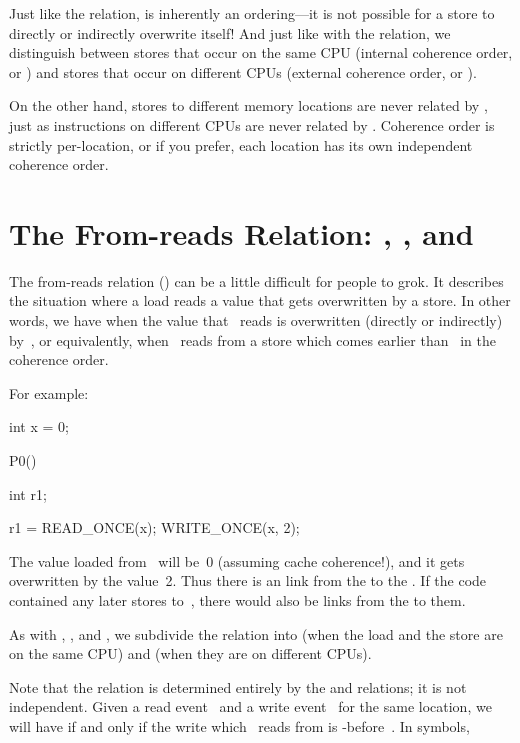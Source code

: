 Just like the  relation,  is inherently an
ordering---it is not possible for a store to directly or indirectly
overwrite itself!
And just like with the  relation, we distinguish between stores that
occur on the same CPU (internal coherence order, or ) and stores
that occur on different CPUs (external coherence order, or ).

On the other hand, stores to different memory locations are never
related by , just as instructions on different CPUs are never
related by .
Coherence order is strictly per-location, or if you prefer, each
location has its own independent coherence order.


\section{The From-reads Relation: , , and }
\label{sec:docs:explanation:The From-reads Relation: fr, fri, and fre}

The from-reads relation () can be a little difficult for people to
grok.
It describes the situation where a load reads a value that gets
overwritten by a store.
In other words, we have  when the value that ~reads
is overwritten (directly or indirectly) by~, or equivalently,
when ~reads from a store which comes earlier than~ in
the coherence order.

For example:

\begin{VerbatimU}
	int x = 0;

	P0()
	{
		int r1;

		r1 = READ_ONCE(x);
		WRITE_ONCE(x, 2);
	}
\end{VerbatimU}

The value loaded from~ will be~0 (assuming cache coherence{!}), and it
gets overwritten by the value~2.
Thus there is an  link from the  to the
.
If the code contained any later stores to~, there would also be
 links from the  to them.

As with , , and , we subdivide the  relation
into  (when the load and the store are on the same CPU) and
 (when they are on different CPUs).

Note that the  relation is determined entirely by the  and
 relations; it is not independent.
Given a read event~ and a write event~ for the same
location, we will have  if and only if the write
which ~reads from is -before~.
In symbols,

